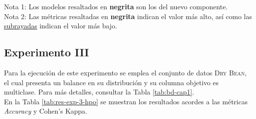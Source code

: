 \begin{minipage}{15cm}
	\small {\footnotesize Nota 1: Los modelos resaltados en \textbf{negrita} son los del nuevo componente.} \\
	\small {\footnotesize Nota 2: Las métricas resaltadas en \textbf{negrita} indican el valor más alto, así como las \underline{subrayadas} indican el valor más bajo.}
\end{minipage}


\subsection{Experimento III}
Para la ejecución de este experimento se emplea el conjunto de datos \textsc{Dry Bean}, el cual presenta un balance en su distribución y su columna objetivo es multiclase. Para más detalles, consultar la Tabla \ref{tab:bd-cap1}. \\
En la Tabla \ref{tab:res-exp-3-hpo} se muestran los resultados acordes a las métricas \textit{Accuracy} y Cohen’s Kappa.




